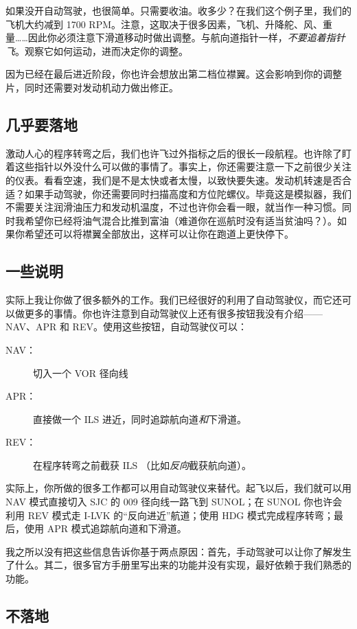 如果没开自动驾驶，也很简单。只需要收油。收多少？在我们这个例子里，我们的飞机大约减到 1700 RPM。注意，这取决于很多因素，飞机、升降舵、风、重量……因此你必须注意下滑道移动时做出调整。与航向道指针一样，\emph{不要追着指针飞}。观察它如何运动，进而决定你的调整。

因为已经在最后进近阶段，你也许会想放出第二档位襟翼。这会影响到你的调整片，同时还需要对发动机动力做出修正。

\subsection{几乎要落地}

激动人心的程序转弯之后，我们也许飞过外指标之后的很长一段航程。也许除了盯着这些指针以外没什么可以做的事情了。事实上，你还需要注意一下之前很少关注的仪表。看看空速，我们是不是太快或者太慢，以致快要失速。发动机转速是否合适？如果手动驾驶，你还需要同时扫描高度和方位陀螺仪。毕竟这是模拟器，我们不需要关注润滑油压力和发动机温度，不过也许你会看一眼，就当作一种习惯。同时我希望你已经将油气混合比推到富油（难道你在巡航时没有适当贫油吗？）。如果你希望还可以将襟翼全部放出，这样可以让你在跑道上更快停下。

\subsection{一些说明}

实际上我让你做了很多额外的工作。我们已经很好的利用了自动驾驶仪，而它还可以做更多的事情。你也许注意到自动驾驶仪上还有很多按钮我没有介绍——NAV、APR 和 REV。使用这些按钮，自动驾驶仪可以：

\begin{description}
\item[NAV：] 切入一个 VOR 径向线
\item[APR：] 直接做一个 ILS 进近，同时追踪航向道\emph{和}下滑道。
\item[REV：] 在程序转弯之前截获 ILS （比如\emph{反向}截获航向道）。
\end{description}

实际上，你所做的很多工作都可以用自动驾驶仪来替代。起飞以后，我们就可以用 NAV 模式直接切入 SJC 的 009 径向线一路飞到 SUNOL；在 SUNOL 你也许会利用 REV 模式走 I-LVK 的“反向进近”航道；使用 HDG 模式完成程序转弯；最后，使用 APR 模式追踪航向道和下滑道。

我之所以没有把这些信息告诉你基于两点原因：首先，手动驾驶可以让你了解发生了什么。其二，很多官方手册里写出来的功能并没有实现，最好依赖于我们熟悉的功能。

\subsection{不落地}

